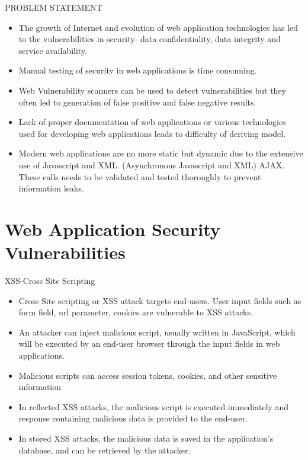 \documentclass{beamer}
\begin{document}
\begin{frame}{PROBLEM STATEMENT}
\begin{itemize}
    \item The growth of Internet and evolution of web application technologies has led to the vulnerabilities in security- data confidentiality, data integrity and service availability. 
    \item Manual testing of security in web applications is time consuming.
    \item Web Vulnerability scanners can be used to detect vulnerabilities but they often led to generation of false positive and false negative results.
    \item Lack of proper documentation of web applications or various technologies used for developing web applications leads to difficulty of deriving model.
    \item Modern web applications are no more static but dynamic due to the extensive use of Javascript and XML.  (Asynchronous Javascript and XML) AJAX. These calls needs to be validated and tested thoroughly to prevent information leaks. 
\end{itemize}
\end{frame}

\section{Web Application Security Vulnerabilities}
\begin{frame}{XSS-Cross Site Scripting}
\begin{itemize}
    \item Cross Site scripting or XSS attack targets end-users. User input fields such as form field, url parameter, cookies are vulnerable to XSS attacks. 
    \item An attacker can inject malicious script, usually written in JavaScript, which will be executed by an end-user browser through the input fields in web applications. 
    \item Malicious scripts can access session tokens, cookies, and other sensitive information   
    \item In reflected XSS attacks, the malicious script is executed immediately and response containing malicious data is provided to the end-user. 
    \item In stored XSS attacks, the malicious data is saved in the application’s database, and can be retrieved by the attacker.
\end{itemize}
\end{frame}
\end{document}
